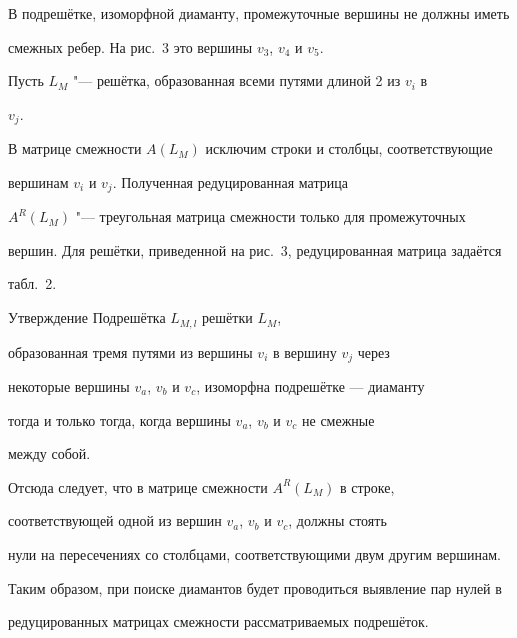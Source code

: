 В подрешётке, изоморфной диаманту, промежуточные вершины не должны иметь

смежных ребер. На рис.~3 это вершины $v_3 $, $v_4 $ и $v_5 $.



Пусть $L_M$ "--- решётка, образованная всеми путями длиной 2 из $v_i$ в

$v_j$.

В матрице смежности $A(L_M)$ исключим строки и столбцы, соответствующие

вершинам $v_i$ и $v_j$. Полученная редуцированная матрица

$A^R(L_M)$ "--- треугольная матрица смежности только для промежуточных

вершин. Для решётки, приведенной на рис.~3, редуцированная матрица задаётся

табл.~2.







\begin{newthm}{Утверждение} Подрешётка $L_{M,l}$ решётки $L_M$,

образованная тремя путями из вершины $v_i$ в вершину $v_j$ через

некоторые вершины $v_a$, $v_b$ и $v_c$, изоморфна подрешётке --- диаманту

тогда и только тогда, когда вершины $v_a$, $v_b$ и $v_c$ не смежные

между собой.

\end{newthm}



Отсюда следует, что в матрице смежности $ A^R(L_M)$ в строке,

соответствующей одной из вершин $v_a$, $v_b$ и $v_c$, должны стоять

нули на пересечениях со столбцами, соответствующими двум другим вершинам.



Таким образом, при поиске диамантов будет проводиться выявление пар нулей в

редуцированных матрицах смежности рассматриваемых подрешёток.



